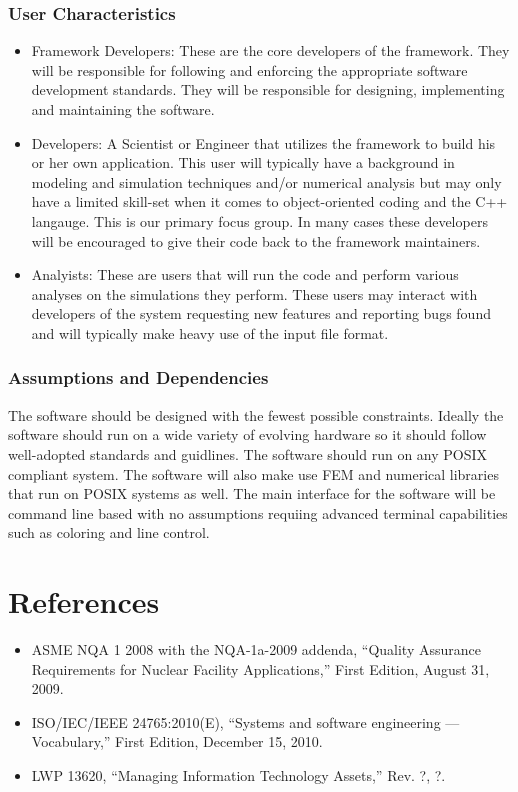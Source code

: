 \documentclass{INLreport}
\begin{document}
\subsubsection{User Characteristics}
\begin{itemize}
\item Framework Developers: These are the core developers of the framework. They will be responsible for following
  and enforcing the appropriate software development standards. They will be responsible for designing, implementing
  and maintaining the software.

\item Developers: A Scientist or Engineer that utilizes the framework to build his or her own application. This user
  will typically have a background in modeling and simulation techniques and/or numerical analysis but may only have
  a limited skill-set when it comes to object-oriented coding and the C++ langauge. This is our primary focus group.
  In many cases these developers will be encouraged to give their code back to the framework maintainers.

\item Analyists: These are users that will run the code and perform various analyses on the simulations they perform.
  These users may interact with developers of the system requesting new features and reporting bugs found and will
  typically make heavy use of the input file format.
\end{itemize}


\subsubsection{Assumptions and Dependencies}
The software should be designed with the fewest possible constraints. Ideally the software should run on a wide
variety of evolving hardware so it should follow well-adopted standards and guidlines. The software should run
on any POSIX compliant system. The software will also make use FEM and numerical libraries that run on POSIX
systems as well. The main interface for the software will be command line based with no assumptions requiing advanced
terminal capabilities such as coloring and line control.

\section{References}

\begin{itemize}
\item ASME NQA 1 2008 with the NQA-1a-2009 addenda, “Quality Assurance Requirements for Nuclear Facility Applications,” First Edition, August 31, 2009.
\item ISO/IEC/IEEE 24765:2010(E), “Systems and software engineering — Vocabulary,” First Edition, December 15, 2010.
\item LWP 13620, “Managing Information Technology Assets,” Rev. ?, ?.
\end{itemize}
\end{document}

